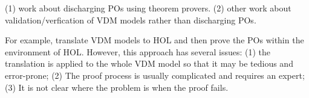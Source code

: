 (1) work about discharging POs using theorem provers. (2) other work about validation/verfication of VDM models rather than discharging POs.

For example, \cite{Verm:2007:master,Vermolen:2010:PCV:1774088.1774608} translate VDM models to HOL and then prove the POs within the environment of HOL. However, this approach has several issues: (1) the translation is applied to the whole VDM model so that it may be tedious and error-prone; (2) The proof process is usually complicated and requires an expert; (3) It is not clear where the problem is when the proof fails.

\cite{AL:97:POGV,CFP:14:TVCSAP,CT:15:EOCGTIS}